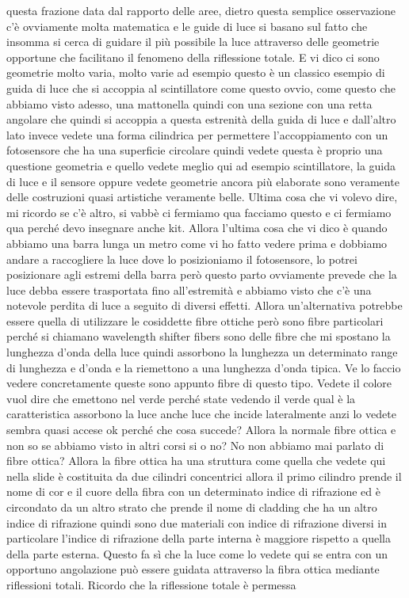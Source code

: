 questa frazione data dal rapporto delle aree, dietro questa semplice osservazione c'è ovviamente molta matematica e le guide di luce si basano sul fatto che insomma si cerca di guidare il più possibile la luce attraverso delle geometrie opportune che facilitano il fenomeno della riflessione totale. E vi dico ci sono geometrie molto varia, molto varie ad esempio questo è un classico esempio di guida di luce che si accoppia al scintillatore come questo ovvio, come questo che abbiamo visto adesso, una mattonella quindi con una sezione con una retta angolare che quindi si accoppia a questa estrenità della guida di luce e dall'altro lato invece vedete una forma cilindrica per permettere l'accoppiamento con un fotosensore che ha una superficie circolare quindi vedete questa è proprio una questione geometria e quello vedete meglio qui ad esempio scintillatore, la guida di luce e il sensore oppure vedete geometrie ancora più elaborate sono veramente delle costruzioni quasi artistiche veramente belle. Ultima cosa che vi volevo dire, mi ricordo se c'è altro, si vabbè ci fermiamo qua facciamo questo e ci fermiamo qua perché devo insegnare anche kit. Allora l'ultima cosa che vi dico è quando abbiamo una barra lunga un metro come vi ho fatto vedere prima e dobbiamo andare a raccogliere la luce dove lo posizioniamo il fotosensore, lo potrei posizionare agli estremi della barra però questo parto ovviamente prevede che la luce debba essere trasportata fino all'estremità e abbiamo visto che c'è una notevole perdita di luce a seguito di diversi effetti. Allora un'alternativa potrebbe essere quella di utilizzare le cosiddette fibre ottiche però sono fibre particolari perché si chiamano wavelength shifter fibers sono delle fibre che mi spostano la lunghezza d'onda della luce quindi assorbono la lunghezza un determinato range di lunghezza e d'onda e la riemettono a una lunghezza d'onda tipica. Ve lo faccio vedere concretamente queste sono appunto fibre di questo tipo. Vedete il colore vuol dire che emettono nel verde perché state vedendo il verde qual è la caratteristica assorbono la luce anche luce che incide lateralmente anzi lo vedete sembra quasi accese ok perché che cosa succede? Allora la normale fibre ottica e non so se abbiamo visto in altri corsi si o no? No non abbiamo mai parlato di fibre ottica? Allora la fibre ottica ha una struttura come quella che vedete qui nella slide è costituita da due cilindri concentrici allora il primo cilindro prende il nome di cor e il cuore della fibra con un determinato indice di rifrazione ed è circondato da un altro strato che prende il nome di cladding che ha un altro indice di rifrazione quindi sono due materiali con indice di rifrazione diversi in particolare l'indice di rifrazione della parte interna è maggiore rispetto a quella della parte esterna. Questo fa sì che la luce come lo vedete qui se entra con un opportuno angolazione può essere guidata attraverso la fibra ottica mediante riflessioni totali. Ricordo che la riflessione totale è permessa 

